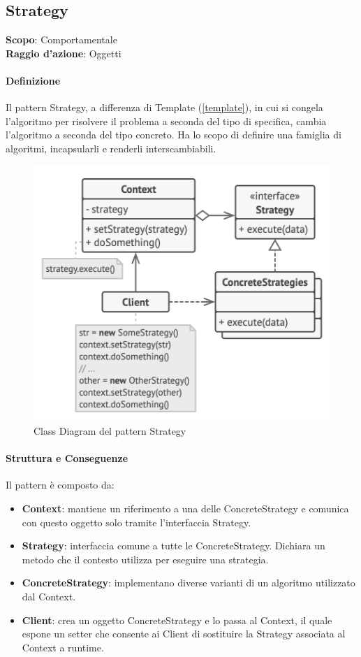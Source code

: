 \subsection{Strategy}
\label{strategy}

\textbf{Scopo}: Comportamentale \\
\textbf{Raggio d'azione}: Oggetti

\paragraph{Definizione} Il pattern Strategy, a differenza di Template (\ref{template}), in cui si congela l'algoritmo per risolvere il problema a seconda del tipo di specifica, cambia l'algoritmo a seconda del tipo concreto. Ha lo scopo di definire una famiglia di algoritmi, incapsularli e renderli interscambiabili.

\begin{figure}[H]
    \centering
    \includegraphics[width=0.5\linewidth]{assets/pattern/strategy/strategy-struttura.png}
    \caption{Class Diagram del pattern Strategy}
\end{figure}

\paragraph{Struttura e Conseguenze} Il pattern è composto da:
\begin{itemize}
    \item \textbf{Context}: mantiene un riferimento a una delle ConcreteStrategy e comunica con questo oggetto solo tramite l’interfaccia Strategy.
    \item \textbf{Strategy}: interfaccia comune a tutte le ConcreteStrategy. Dichiara un metodo che il contesto utilizza per eseguire una strategia.
    \item \textbf{ConcreteStrategy}: implementano diverse varianti di un algoritmo utilizzato dal Context.
    \item \textbf{Client}: crea un oggetto ConcreteStrategy e lo passa al Context, il quale espone un setter che consente ai Client di sostituire la Strategy associata al Context a runtime.
\end{itemize}

